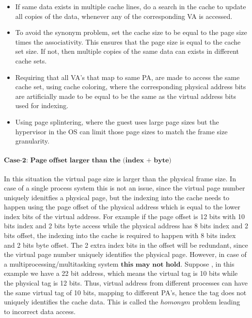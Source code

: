 \documentclass{tufte-handout}
\begin{document}
			\begin{itemize}
				\item If same data exists in multiple cache lines, do a search in the cache to update all copies of the data, whenever any of the corresponding VA is accessed.
				\item To avoid the synonym problem, set the cache size to be equal to the page size times the associativity. This ensures that the page size is equal to the cache set size. If not, then multiple copies of the same data can exists in different cache sets.
				\item Requiring that all VA's that map to same PA, are made to access the same cache set, using cache coloring, where the corresponding physical address bits are artificially made to be equal to be the same as the virtual address bits used for indexing.
				\item Using page splintering, where the guest uses large page sizes but the hypervisor in the OS can limit those page sizes to match the frame size granularity.
			\end{itemize}

		\paragraph{$\textbf{Case-2: Page offset larger than the (index + byte)}$}
			In this situation the virtual page size is larger than the physical frame size. In case of a single process system this is not an issue, since  the virtual page number uniquely idenitfies a physical page, but the indexing into the cache needs to happen using the page offset of the physical address which is equal to the lower index bits of the virtual address. For example if the page offset is 12 bits with 10 bits index and 2 bits byte access while the physical address has 8 bits index and 2 bits offset, the indexing into the cache is required to happen with 8 bits index and 2 bits byte offset. The 2 extra index bits in the offset will be redundant, since the virtual page number uniquely identifies the physical page. However, in case of a multiprocessing/multitasking system $\textbf{this may not hold}$. Suppose , in this example we have a 22 bit address, which means the virtual tag is 10 bits while the physical tag is 12 bits. Thus, virtual address from different processes can have the same virtual tag of 10 bits, mapping to different PA's, hence the tag does not uniquely identifies the cache data. This is called the $homonym$ problem leading to incorrect data access.
\end{document}
